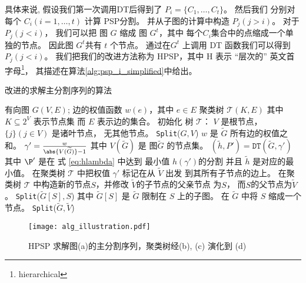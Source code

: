 具体来说,
假设我们第一次调用DT后得到了
$P_i = \{C_1, \dots, C_t\}$。
然后我们 分别对每个
$C_i(i=1,\dots, t)$
计算 PSP分割。
并从子图的计算中构造 $P_j(j>i)$。
对于 $P_j(j<i)$，
我们可以把 图 $G$
缩成 图 $G^t$，其中 每个$C_i$集合中的点缩成一个单独的节点。
因此图 $G^t$共有 $t$ 个节点。
通过在$G^t$ 上调用 DT 函数我们可以得到  $P_j(j<i)$。
我们把我们的改进方法称为 HPSP，其中 H 表示 “层次的”
英文首字母\footnote{hierarchical}，
其描述在算法\ref{alg:psp_i_simplified}中给出。

\begin{algorithm}[!ht]
	\caption{改进的求解主分割序列的算法}\label{alg:psp_i_simplified}
	\begin{algorithmic}[1]
		\REQUIRE 有向图 $G(V, E)$; 边的权值函数 $w(e)$，其中 $e\in E$
		\ENSURE 聚类树 $\mathcal{T}(K, E)$ 其中 $K \subseteq 2^{V}$ 表示节点集
    而 $E$ 表示边的集合。
		\STATE 初始化 树 $\mathcal{T}$：
     $V$ 是根节点，
     $\{j\}(j \in V)$ 是诸叶节点，
     无其他节点。
		\STATE \texttt{Split}($G, V$)
		\STATE $w$ 是 $\widetilde{G}$ 所有边的权值之和。
		\STATE $\gamma' = \frac{w}{\abs{V(\widetilde{G})}-1}$
    其中 $V(\widetilde{G})$ 是 图$\widetilde{G}$
    的节点集。
    \label{alg:gamma_apostrophe}
		\STATE $(\tilde{h}, P') = \texttt{DT}(\widetilde{G}, \gamma')$ 其中
    $\P'$ 是在 式 \eqref{eq:hlambda} 中达到
    最小值 $h(\gamma')$的分割
    并且 $\tilde{h}$ 是对应的最小值。 \label{line:DT}
		\STATE 在聚类树
    $\mathcal{T}$ 中把权值 $\gamma'$ 标记在从 $\widetilde{V}$ 出发
    到其所有子节点的边上。
		\ELSE
		\STATE 在聚类树
    $\mathcal{T}$ 中构造新的节点$S$，并修改 $\widetilde{V}$的子节点的父亲节点 为$S$，
    而$S$的父节点为$\widetilde{V}$。
		\STATE \texttt{Split}($\widetilde{G}[S], S$)
    其中 $\widetilde{G}[S]$ 是 $\widetilde{G}$ 限制在 $S$
    上的子图。\label{line:SplitDown}
		\STATE 在 $\widetilde{G}$ 中将 $S$ 缩成一个节点。 %
		\ENDFOR 
		\STATE \texttt{Split}($\widetilde{G}, \widetilde{V}$)		\label{line:SplitUp}
		\ENDIF
		\ENDFUNCTION
	\end{algorithmic}
\end{algorithm}

\begin{figure}[!ht]
	\centering
	\texttt{[image: alg\_illustration.pdf]}
	\caption{HPSP 求解图(a)的主分割序列，聚类树经(b), (c) 演化到 (d) }\label{fig:alg_eg}
\end{figure}

